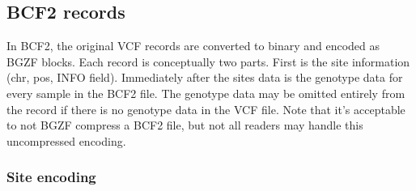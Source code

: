 \documentclass[8pt]{article}
\begin{document}
\subsection{BCF2 records}


In BCF2, the original VCF records are converted to binary and encoded as BGZF blocks.  Each record is conceptually two parts.  First is the site information (chr, pos, INFO field).  Immediately after the sites data is the genotype data for every sample in the BCF2 file.  The genotype data may be omitted entirely from the record if there is no genotype data in the VCF file.  Note that it's acceptable to not BGZF compress a BCF2 file, but not all readers may handle this uncompressed encoding.

\subsubsection{Site encoding}
\label{BcfSiteEncoding}
\end{document}

